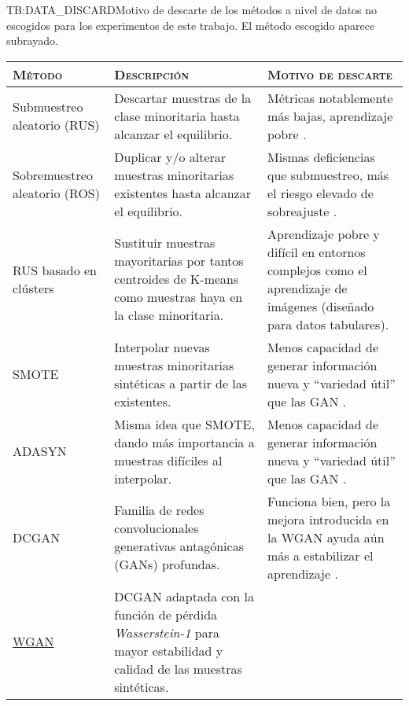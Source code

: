 \begin{table}[Motivo de descarte - métodos a nivel de datos]{TB:DATA_DISCARD}{Motivo de descarte de los métodos a nivel de datos no escogidos para los experimentos de este trabajo. El método escogido aparece subrayado.}
    \small
    \hskip-3.0cm\begin{tabular}{|l|p{6.5cm}|p{6.5cm}|}
        \hline
        \textsc{Método} & \textsc{Descripción} & \textsc{Motivo de descarte} \\
        \hline
        Submuestreo aleatorio (RUS) & Descartar muestras de la clase minoritaria hasta alcanzar el equilibrio. & Métricas notablemente más bajas, aprendizaje pobre \cite{johnson2019survey, upadhyay2021state, nafi2020addressing}. \\ \hline
        Sobremuestreo aleatorio (ROS) & Duplicar y/o alterar muestras minoritarias existentes hasta alcanzar el equilibrio. & Mismas deficiencias que submuestreo, más el riesgo elevado de sobreajuste \cite{johnson2019survey, upadhyay2021state, nafi2020addressing}. \\ \hline
        RUS basado en clústers \cite{lin2017clustering} & Sustituir muestras mayoritarias por tantos centroides de K-means como muestras haya en la clase minoritaria. & Aprendizaje pobre y difícil en entornos complejos como el aprendizaje de imágenes (diseñado para datos tabulares). \\ \hline
        SMOTE \cite{chawla2002smote} & Interpolar nuevas muestras minoritarias sintéticas a partir de las existentes. & Menos capacidad de generar información nueva y ``variedad útil'' que las GAN \cite{nafi2020addressing}. \\ \hline
        ADASYN \cite{he2008adasyn} & Misma idea que SMOTE, dando más importancia a muestras difíciles al interpolar. & Menos capacidad de generar información nueva y ``variedad útil'' que las GAN \cite{nafi2020addressing}. \\ \hline
        DCGAN \cite{nafi2020addressing} & Familia de redes convolucionales generativas antagónicas (GANs) profundas. & Funciona bien, pero la mejora introducida en la WGAN ayuda aún más a estabilizar el aprendizaje \cite{nafi2020addressing}. \\ \hline
        
        
        \underline{WGAN} \cite{arjovsky2017wasserstein} & DCGAN adaptada con la función de pérdida \textit{Wasserstein-1} para mayor estabilidad y calidad de las muestras sintéticas. & \\ \hline
    \end{tabular}
\end{table}

